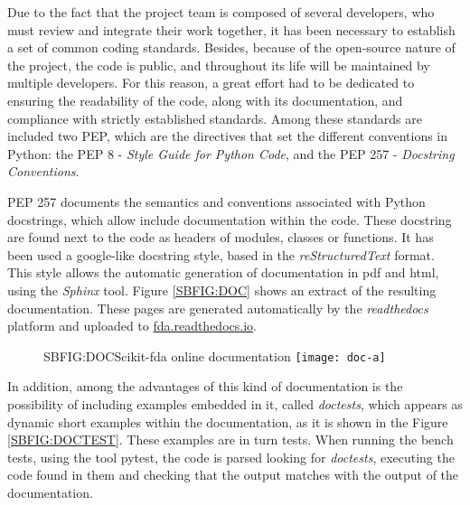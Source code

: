 

Due to the fact that the project team is composed of several developers, who
must review and integrate their work together, it has been necessary to
establish a set of common coding standards.
Besides, because of the open-source nature of the project, the code is
public, and throughout its life will be maintained by multiple developers. For
this reason, a great effort had to be dedicated to ensuring the readability of
the code, along with its documentation, and compliance with strictly established
standards. Among these standards are included two \ac{PEP}, which are the directives that set the different conventions in Python:
the \ac{PEP} 8 - \textit{Style Guide for Python Code}, and the \acs{PEP} 257 - \textit{Docstring Conventions}.
\newpage

\acs{PEP} 257 documents the semantics and conventions associated with Python
docstrings, which allow include documentation within the code. These docstring
are found next to the code as headers of modules, classes or functions. It has
been used a google-like docstring style, based in the \textit{reStructuredText} format.
This style allows the automatic generation of documentation in pdf and html,
using the \textit{Sphinx} tool. Figure \ref{SBFIG:DOC} shows an extract of the resulting documentation. These pages are generated automatically  by
the \textit{readthedocs} platform and uploaded to
\href{https://fda.readthedocs.io/}{fda.readthedocs.io}.

\begin{figure}[Scikit-fda online documentation]{SBFIG:DOC}{Scikit-fda online documentation}
	\texttt{[image: doc-a]}
\end{figure}

In addition, among the advantages of this kind of documentation is the
possibility of including examples embedded in it, called \textit{doctests}, which appears
 as dynamic short examples within the documentation, as it is shown in the
 Figure \ref{SBFIG:DOCTEST}.
These examples are in turn tests. When running the bench tests, using the tool
pytest, the code is parsed looking for \textit{doctests}, executing the code found in
them and checking that the output matches with the output of the documentation.

